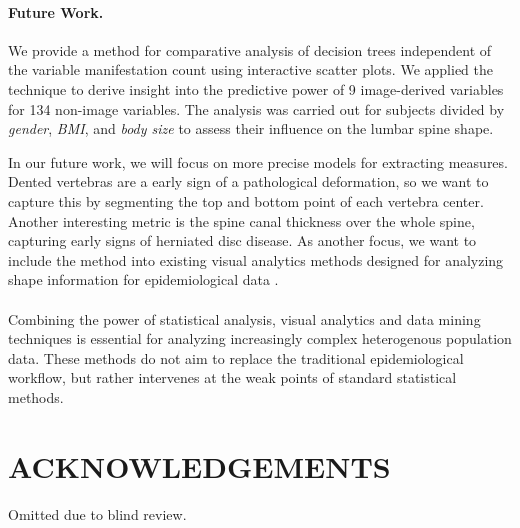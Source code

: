 \documentclass[a4paper,twoside]{style/article}
\newcommand{\com}[1]{\textcolor{orange}{\uline{#1}}}
\begin{document}
\paragraph{Future Work.}
We provide a method for comparative analysis of decision trees independent of the variable manifestation count using interactive scatter plots.
We applied the technique to derive insight into the predictive power of 9 image-derived variables for 134 non-image variables.
The analysis was carried out for subjects divided by \emph{gender}, \emph{BMI}, and \emph{body size} to assess their influence on the lumbar spine shape.

In our future work, we will focus on more precise models for extracting measures.
Dented vertebras are a early sign of a pathological deformation, so we want to capture this by segmenting the top and bottom point of each vertebra center.
Another interesting metric is the spine canal thickness over the whole spine, capturing early signs of herniated disc disease.
As another focus, we want to include the method into existing visual analytics methods designed for analyzing shape information for epidemiological data \cite{Klemm2014VIS}.
\\\\
Combining the power of statistical analysis, visual analytics and data mining techniques is essential for analyzing increasingly complex heterogenous population data.
These methods do not aim to replace the traditional epidemiological workflow, but rather intervenes at the weak points of standard statistical methods.

\section*{\uppercase{Acknowledgements}}
\noindent Omitted due to blind review.


\vfill

{\small
}




\vfill
\end{document}
